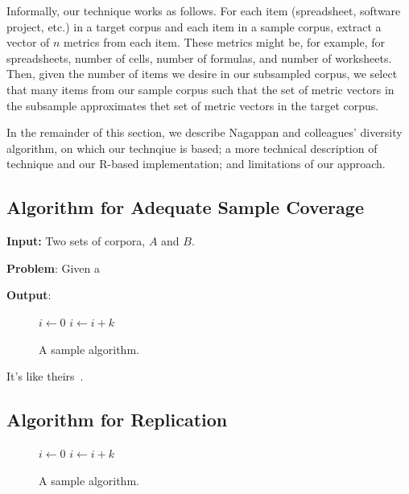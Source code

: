 \documentclass[conference]{IEEEtran}
\begin{document}

Informally, our technique works as follows.
For each item (spreadsheet, software project, etc.) in a target corpus and each
item in a sample corpus, extract a vector of $n$ metrics from each item.
These metrics might be, for example, for spreadsheets, number of cells,
number of formulas, and number of worksheets.
Then, given the number of items we desire in our subsampled corpus,
we select that many items from our sample corpus such that
the set of metric vectors in the subsample approximates thet set
of metric vectors in the target corpus.

In the remainder of this section, we describe Nagappan and colleagues'
diversity algorithm, on which our technqiue is based; 
a more technical description of technique and our R-based implementation;
and limitations of our approach.

\subsection{Algorithm for Adequate Sample Coverage}

\textbf{Input:} Two sets of corpora, $A$ and $B.$

\textbf{Problem}: Given a 

\textbf{Output}:

\begin{figure}[!t]
\begin{algorithmic}
    \State $i\gets 0$
\Else
        \State $i\gets i+k$
    \EndIf
\EndIf
\end{algorithmic}
\caption{A sample algorithm.}
\label{fig:algorithm}
\end{figure}
It's like theirs~\cite{nagappan2013diversity}.

\subsection{Algorithm for Replication}

\begin{figure}[!t]
\begin{algorithmic}
    \State $i\gets 0$
\Else
        \State $i\gets i+k$
    \EndIf
\EndIf
\end{algorithmic}
\caption{A sample algorithm.}
\label{fig:algorithm}
\end{figure}
\end{document}
